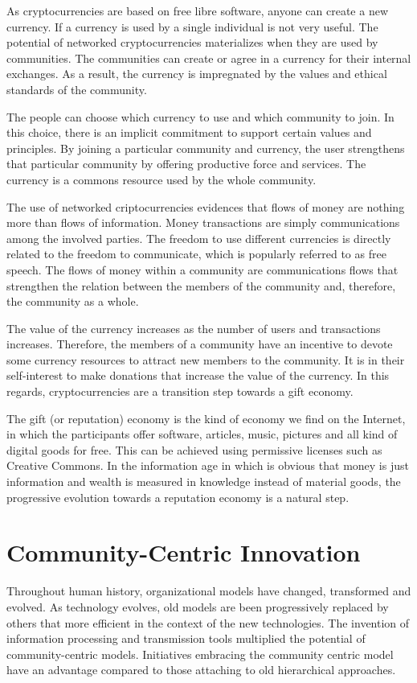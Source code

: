 \documentclass[journal]{IEEEtran}
\begin{document}
As cryptocurrencies are based on free libre software, anyone can create a new currency.
If a currency is used by a single individual is not very useful.
The potential of networked cryptocurrencies materializes when they are used by communities.
The communities can create or agree in a currency for their internal exchanges.
As a result, the currency is impregnated by the values and ethical standards of the community.

The people can choose which currency to use and which community to join.
In this choice, there is an implicit commitment to support certain values and principles.
By joining a particular community and currency, the user strengthens that particular community by offering productive force and services.
The currency is a commons resource used by the whole community.

The use of networked criptocurrencies evidences that flows of money are nothing more than flows of information.
Money transactions are simply communications among the involved parties.
The freedom to use different currencies is directly related to the freedom to communicate, which is popularly referred to as free speech.
The flows of money within a community are communications flows that strengthen the relation between the members of the community and, therefore, the community as a whole.

The value of the currency increases as the number of users and transactions increases.
Therefore, the members of a community have an incentive to devote some currency resources to attract new members to the community.
It is in their self-interest to make donations that increase the value of the currency.
In this regards, cryptocurrencies are a transition step towards a gift economy.

The gift (or reputation) economy is the kind of economy we find on the Internet, in which the participants offer software, articles, music, pictures and all kind of digital goods for free.
This can be achieved using permissive licenses such as Creative Commons.
In the information age in which is obvious that money is just information and wealth is measured in knowledge instead of material goods, the progressive evolution towards a reputation economy is a natural step.

\section{Community-Centric Innovation}

Throughout human history, organizational models have changed, transformed and evolved.
As technology evolves, old models are been progressively replaced by others that more efficient in the context of the new technologies.
The invention of information processing and transmission tools multiplied the potential of community-centric models.
Initiatives embracing the community centric model have an advantage compared to those attaching to old hierarchical approaches.
\end{document}
